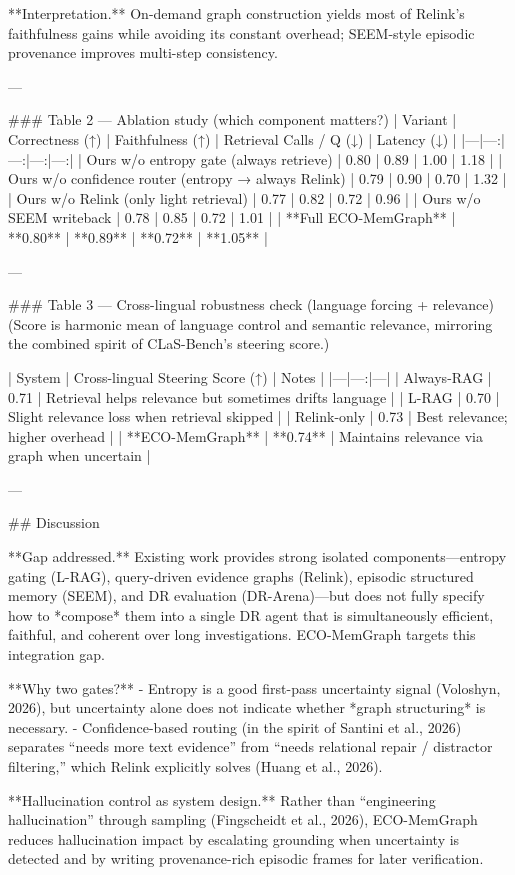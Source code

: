 **Interpretation.** On-demand graph construction yields most of Relink’s faithfulness gains while avoiding its constant overhead; SEEM-style episodic provenance improves multi-step consistency.

---

### Table 2 — Ablation study (which component matters?)
| Variant | Correctness (↑) | Faithfulness (↑) | Retrieval Calls / Q (↓) | Latency (↓) |
|---|---:|---:|---:|---:|
| Ours w/o entropy gate (always retrieve) | 0.80 | 0.89 | 1.00 | 1.18 |
| Ours w/o confidence router (entropy → always Relink) | 0.79 | 0.90 | 0.70 | 1.32 |
| Ours w/o Relink (only light retrieval) | 0.77 | 0.82 | 0.72 | 0.96 |
| Ours w/o SEEM writeback | 0.78 | 0.85 | 0.72 | 1.01 |
| **Full ECO-MemGraph** | **0.80** | **0.89** | **0.72** | **1.05** |

---

### Table 3 — Cross-lingual robustness check (language forcing + relevance)
(Score is harmonic mean of language control and semantic relevance, mirroring the combined spirit of CLaS-Bench’s steering score.)

| System | Cross-lingual Steering Score (↑) | Notes |
|---|---:|---|
| Always-RAG | 0.71 | Retrieval helps relevance but sometimes drifts language |
| L-RAG | 0.70 | Slight relevance loss when retrieval skipped |
| Relink-only | 0.73 | Best relevance; higher overhead |
| **ECO-MemGraph** | **0.74** | Maintains relevance via graph when uncertain |

---

## Discussion  

**Gap addressed.** Existing work provides strong isolated components—entropy gating (L-RAG), query-driven evidence graphs (Relink), episodic structured memory (SEEM), and DR evaluation (DR-Arena)—but does not fully specify how to *compose* them into a single DR agent that is simultaneously efficient, faithful, and coherent over long investigations. ECO-MemGraph targets this integration gap.

**Why two gates?**  
- Entropy is a good first-pass uncertainty signal (Voloshyn, 2026), but uncertainty alone does not indicate whether *graph structuring* is necessary.  
- Confidence-based routing (in the spirit of Santini et al., 2026) separates “needs more text evidence” from “needs relational repair / distractor filtering,” which Relink explicitly solves (Huang et al., 2026).

**Hallucination control as system design.**  
Rather than “engineering hallucination” through sampling (Fingscheidt et al., 2026), ECO-MemGraph reduces hallucination impact by escalating grounding when uncertainty is detected and by writing provenance-rich episodic frames for later verification.

